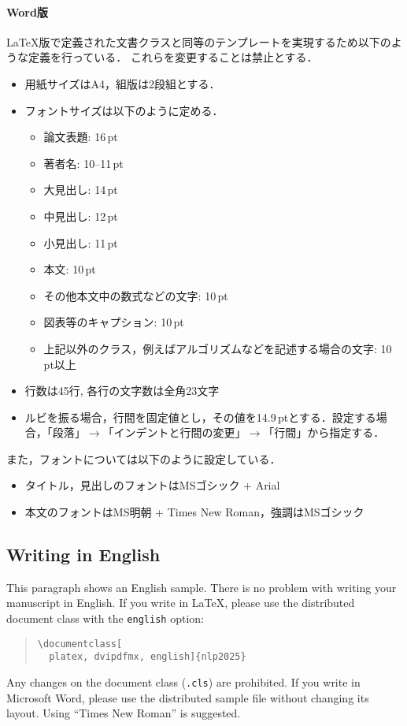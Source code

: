 \documentclass[
  platex, dvipdfmx,  %
]{nlp2025}
\newcommand{\code}[1]{\texttt{#1}}
\begin{document}
\paragraph{Word版}
LaTeX版で定義された文書クラスと同等のテンプレートを実現するため以下のような定義を行っている．
これらを変更することは禁止とする．
\begin{itemize}
    \item 用紙サイズはA4，組版は2段組とする．
    \item フォントサイズは以下のように定める．
    \begin{itemize}
        \item 論文表題: 16\,pt
        \item 著者名: 10--11\,pt
        \item 大見出し: 14\,pt
        \item 中見出し: 12\,pt
        \item 小見出し: 11\,pt
        \item 本文: 10\,pt
        \item その他本文中の数式などの文字: 10\,pt
        \item 図表等のキャプション: 10\,pt
        \item 上記以外のクラス，例えばアルゴリズムなどを記述する場合の文字: 10\,pt以上
    \end{itemize}
    \item 行数は45行, 各行の文字数は全角23文字
    \item ルビを振る場合，行間を固定値とし，その値を14.9\,ptとする．設定する場合，「段落」$\xrightarrow{}$「インデントと行間の変更」$\xrightarrow{}$「行間」から指定する．
\end{itemize}
また，フォントについては以下のように設定している．
\begin{itemize}
\item タイトル，見出しのフォントはMSゴシック + Arial
\item 本文のフォントはMS明朝 + Times New Roman，強調はMSゴシック
\end{itemize}


\subsection{Writing in English}
This paragraph shows an English sample.
There is no problem with writing your manuscript in English.
If you write in LaTeX, please use the distributed document class with the \code{english} option:
\begin{quote}
\verb|\documentclass[|\\
\verb|  platex, dvipdfmx, english]{nlp2025}|
\end{quote}
Any changes on the document class (\code{.cls}) are prohibited.
If you write in Microsoft Word, please use the distributed sample file without changing its layout.
Using ``Times New Roman'' is suggested.
\end{document}
